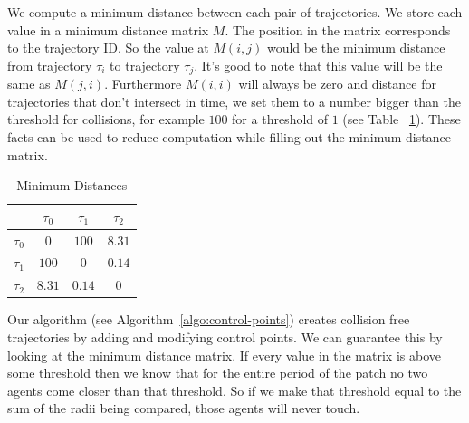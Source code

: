 We compute a minimum distance between each pair of trajectories. We store each value in a minimum distance matrix $M$. The position in the matrix corresponds to the trajectory ID. So the value at $M(i, j)$ would be the minimum distance from trajectory $\tau_i$ to trajectory $\tau_j$. It's good to note that this value will be the same as $M(j,i)$. Furthermore $M(i,i)$ will always be zero and distance for trajectories that don't intersect in time, we set them to a number bigger than the threshold for collisions, for example $100$ for a threshold of $1$ (see Table ~\ref{tab:minimum-distances}). These facts can be used to reduce computation while filling out the minimum distance matrix.

\begin{table}[t]
	\centering
	\caption{Minimum Distances}
	\begin{tabular}{|c||c|c|c|}
		\hline
		 & $\tau_0$	& $\tau_1$ & $\tau_2$\\ \hline \hline
		$\tau_0$	& $0$		&	$100$ & $8.31$\\  \hline
		$\tau_1$	& $100$		&	$0$ & $0.14$\\  \hline
		$\tau_2$	& $8.31$		&	$0.14$ & $0$\\
		\hline
		\end{tabular}
\label{tab:minimum-distances}
\end{table}


Our algorithm (see Algorithm~\ref{algo:control-points}) creates collision free trajectories by adding and modifying control points. We can guarantee this by looking at the minimum distance matrix. If every value in the matrix is above some threshold then we know that for the entire period of the patch no two agents come closer than that threshold. So if we make that threshold equal to the sum of the radii being compared, those agents will never touch.



